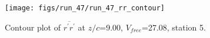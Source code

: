 \begin{figure}[H]
\centering
\texttt{[image: figs/run\_47/run\_47\_rr\_contour]}
\caption{Contour plot of $\overline{r^\prime r^\prime}$ at $z/c$=9.00, $V_{free}$=27.08, station 5.}
\end{figure}


